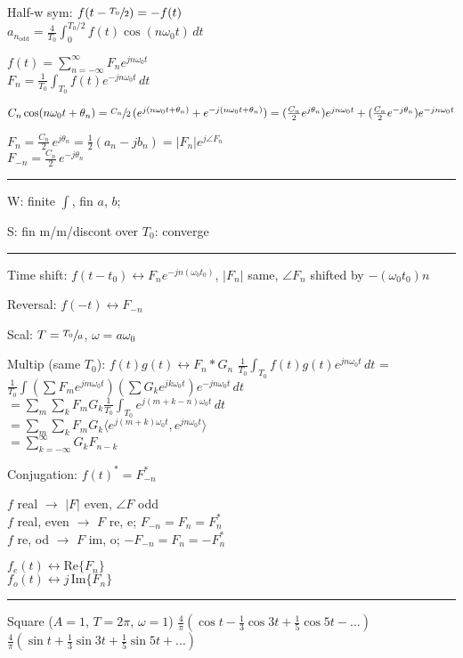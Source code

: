 \documentclass[6pt]{article}
\theoremstyle{definition}
\theoremstyle{definition}
\begin{document}
\begin{multicols*}{3}
    Half-w sym: $f(t - \sfrac{T_0}{2}) = -f(t)$\\
    $a_{n_\mathrm{odd}} = \frac{4}{T_0}\int_{0}^{T_0/2} f(t) \cos (n\omega_0 t) \, dt$

    $f(t) = \sum_{n=-\infty}^{\infty} F_n e^{jn\omega_0 t}$\\
    $F_n = \frac{1}{T_0}\int_{T_0} f(t) e^{-jn\omega_0t}\,dt$

    $C_n\cos(n\omega_0 t + \theta_n) = \sfrac{C_n}{2} \, (e^{j(n\omega_0t + \theta_n)} + e^{-j(n\omega_0 t + \theta_n)}) = (\frac{C_n} 2 e^{j\theta_n}) e^{jn\omega_0 t} + (\frac{C_n} 2 e^{-j\theta_n}) e^{-jn\omega_0 t}$

    $F_n = \frac{C_n}{2}\, e^{j\theta_n} = \frac 1 2 (a_n - jb_n) = |F_n| e^{j\angle F_n}$\\
    $F_{-n} = \frac{C_n}{2}\, e^{-j\theta_n}$
\rule{\linewidth}{0.5pt}
    W: finite $\int$, fin $a$, $b$;

    S: fin m/m/discont over $T_0$: converge
\rule{\linewidth}{0.5pt}
    Time shift: $f(t-t_0)\leftrightarrow F_n e^{-jn(\omega_0 t_0)}$, $|F_n|$ same, $\angle F_n$ shifted by $-(\omega_0 t_0)n$

    Reversal: $f(-t)\leftrightarrow F_{-n}$

    Scal: $T = \sfrac {T_0} a$, $\omega = a\omega_0$

    Multip (same $T_0$): $f(t) g(t) \leftrightarrow F_n * G_n$ 
        $\frac 1{T_0}  \int_{T_0} f(t) g(t) e^{jn\omega_0 t}\, dt$ =\\
        $ \frac{1}{T_0} \int (\sum F_m e^{jm\omega_0 t}) (\sum G_k e^{jk\omega_0 t}) e^{-jn\omega_0 t} \, dt$ \\
        $ = \sum_m \sum_k F_m G_k \frac{1}{T_0} \int_{T_0} e^{j(m+k-n)\omega_0 t} \, dt$\\
        $ = \sum_m \sum_k F_m G_k \langle e^{j(m+k)\omega_0 t}, e^{jn\omega_0 t}\rangle$\\
        $ = \sum_{k=-\infty}^{\infty} G_k F_{n-k}$
        
    Conjugation: $f(t)^* = F^*_{-n}$

        $f$ real $\rightarrow$ $|F|$ even, $\angle F$ odd\\
        $f$ real, even $\rightarrow$ $F$ re, e; $F_{-n} = F_n = F_n^*$\\
        $f$ re, od $\rightarrow$ $F$ im, o; $-F_{-n} = F_n = -F_n^*$

        $f_e(t) \leftrightarrow \mathrm{Re}\{ F_n\}$\\
        $f_o(t) \leftrightarrow j \,\mathrm{Im} \{F_n\}$
\rule{\linewidth}{0.5pt}
    Square ($A=1$, $T=2\pi$, $\omega = 1$) 
        $\frac{4}{\pi}(\cos t - \frac{1}{3}\cos 3t + \frac{1}{5} \cos 5t- ...)$\\
        $\frac{4}{\pi}(\sin t + \frac 1 3 \sin 3t + \frac 1 5 \sin 5t + ...)$


\end{multicols*}
\end{document}

